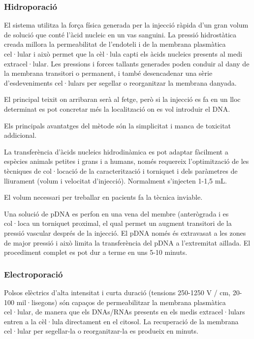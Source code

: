 \subsubsection{Hidroporació}
\label{sec:hidroporacio}

El sistema utilitza la força física generada per la injecció ràpida d'un gran volum de solució que conté l'àcid nucleic en un vas sanguini. La pressió hidrostàtica creada millora la permeabilitat de l'endoteli i de la membrana plasmàtica cel·lular i això permet que la cèl·lula capti els àcids nucleics presents al medi extracel·lular. Les pressions i forces tallants generades poden conduir al dany de la membrana transitori o permanent, i també desencadenar una sèrie d'esdeveniments cel·lulars per segellar o reorganitzar la membrana danyada.

El principal teixit on arribaran serà al fetge, però si la injecció es fa en un lloc determinat es pot concretar més la localització on es vol introduir el DNA.

Els principals avantatges del mètode són la simplicitat i manca de toxicitat addicional.

La transferència d'àcids nucleics hidrodinàmica es pot adaptar fàcilment a espècies animals petites i grans i a humans, només requereix l'optimització de les tècniques de col·locació de la caracterització i torniquet i dels paràmetres de lliurament (volum i velocitat d'injecció). Normalment s'injecten 1-1,5 mL.

El volum necessari per treballar en pacients fa la tècnica inviable.

Una solució de pDNA es perfon en una vena del membre (anterògrada i es col·loca un torniquet proximal, el qual permet un augment transitori de la pressió vascular després de la injecció. El pDNA només és extravasat a les zones de major pressió i això limita la transferència del pDNA a l'extremitat aïllada. El procediment complet es pot dur a terme en uns 5-10 minuts.

\subsubsection{Electroporació}
\label{sec:electroporacio}
Polsos elèctrics d'alta intensitat i curta duració (tensions 250-1250 V / cm, 20-100 mil·lisegons) són capaços de permeabilitzar la membrana plasmàtica cel·lular, de manera que els DNAs/RNAs presents en els medis extracel·lulars entren a la cèl·lula directament en el citosol. La recuperació de la membrana cel·lular per segellar-la o reorganitzar-la es produeix en minuts.

